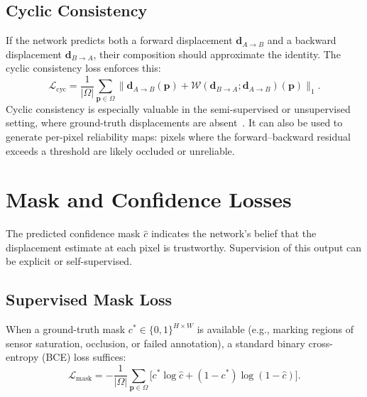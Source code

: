 \subsection{Cyclic Consistency}
\label{ssec:cyclic}

If the network predicts both a forward displacement $\mathbf{d}_{A\to B}$ and
a backward displacement $\mathbf{d}_{B\to A}$, their composition should
approximate the identity.  The cyclic consistency loss enforces this:
%
\begin{equation}
  \mathcal{L}_{\text{cyc}}
  = \frac{1}{|\Omega|}\sum_{\mathbf{p}\in\Omega}
    \bigl\lVert \mathbf{d}_{A\to B}(\mathbf{p})
              + \mathcal{W}(\mathbf{d}_{B\to A};\mathbf{d}_{A\to B})(\mathbf{p})
    \bigr\rVert_{1}.
  \label{eq:cyclic}
\end{equation}
%
Cyclic consistency is especially valuable in the semi-supervised or
unsupervised setting, where ground-truth displacements are
absent~\cite{meister2018unflow,jonschkowski2020matters}.  It can also be used
to generate per-pixel reliability maps: pixels where the forward--backward
residual exceeds a threshold are likely occluded or unreliable.


\section{Mask and Confidence Losses}
\label{sec:mask_loss}

The predicted confidence mask $\hat{c}$ indicates the network's belief that
the displacement estimate at each pixel is trustworthy.  Supervision of this
output can be explicit or self-supervised.

\subsection{Supervised Mask Loss}
\label{ssec:mask_supervised}

When a ground-truth mask $c^{*} \in \{0,1\}^{H\times W}$ is available (e.g.,
marking regions of sensor saturation, occlusion, or failed annotation), a
standard binary cross-entropy (BCE) loss suffices:
%
\begin{equation}
  \mathcal{L}_{\text{mask}}
  = -\frac{1}{|\Omega|}\sum_{\mathbf{p}\in\Omega}\bigl[
      c^{*}\log\hat{c} + (1-c^{*})\log(1-\hat{c})
    \bigr].
  \label{eq:bce}
\end{equation}

